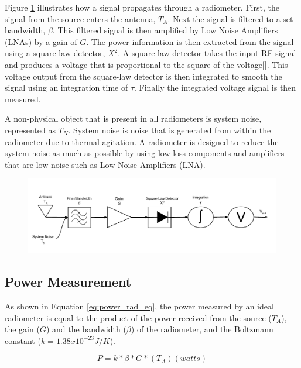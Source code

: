 Figure \ref{trad_radiometer} illustrates how a signal propagates through a radiometer.  First, the signal from the source enters the antenna, $T_A$.  Next the signal is filtered to a set bandwidth, $\beta$.  This filtered signal is then amplified by Low Noise Amplifiers (LNAs) by a gain of $G$.  The power information is then extracted from the signal using a square-law detector, $X^2$.  A square-law detector takes the input RF signal and produces a voltage that is proportional to the square of the voltage[\cite{Leinweber}].  This voltage output from the square-law detector is then integrated to smooth the signal using an integration time of $\tau$.  Finally the integrated voltage signal is then measured.

A non-physical object that is present in all radiometers is system noise, represented as $T_{N}$.  System noise is noise that is generated from within the radiometer due to thermal agitation.  A radiometer is designed to reduce the system noise as much as possible by using low-loss components and amplifiers that are low noise such as Low Noise Amplifiers (LNA). 

{\begin{figure}[h!tb] 
\centering
\includegraphics[width=\textwidth]{Images/Traditional_Radiometer.pdf}
\label{trad_radiometer}
\end{figure}
}

\subsection{Power Measurement}\label{pwr_measurement}

As shown in Equation \ref{eq:power_rad_eq}, the power measured by an ideal radiometer is equal to the product of the power received from the source ($T_A$), the gain ($G$) and the bandwidth ($\beta$) of the radiometer, and the Boltzmann constant ($k=1.38 x 10^{-23} J/K$).

\begin{equation} \label{eq:power_rad_eq}
P=k*\beta*G*(T_{A}) (watts)
\end{equation}

